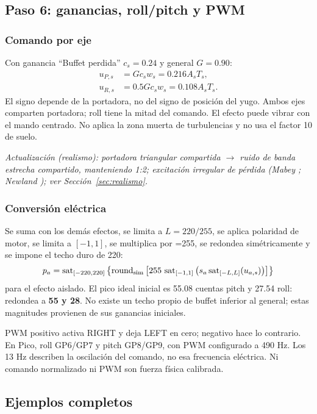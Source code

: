 \subsection{Paso 6: ganancias, roll/pitch y PWM}
\subsubsection{Comando por eje}
Con ganancia ``Buffet perdida'' $c_s=0.24$ y general $G=0.90$:
\begin{align}
u_{P,s}&=Gc_sw_s=0.216 A_sT_s,\\
u_{R,s}&=0.5Gc_sw_s=0.108 A_sT_s.
\end{align}
El signo depende de la portadora, no del signo de posición del yugo. Ambos ejes comparten portadora; roll tiene la mitad del comando. El efecto puede vibrar con el mando centrado. No aplica la zona muerta de turbulencias y no usa el factor 10 de suelo.

\textit{Actualización (realismo): portadora triangular compartida $\rightarrow$ ruido de banda estrecha compartido, manteniendo 1:2; excitación irregular de pérdida (Mabey \cite{mabey1988}; Newland \cite{newland1993}); ver Sección~\ref{sec:realismo}.}

\subsubsection{Conversión eléctrica}
Se suma con los demás efectos, se limita a $L=220/255$, se aplica polaridad de motor, se limita a $[-1,1]$, se multiplica por =255, se redondea simétricamente y se impone el techo duro de 220:
\begin{equation}
p_a=\operatorname{sat}_{[-220,220]}\left\{\operatorname{round}_{\rm sim}
\left[255\,\operatorname{sat}_{[-1,1]}\left(s_a\operatorname{sat}_{[-L,L]}(u_{a,s})\right)\right]\right\}
\end{equation}
para el efecto aislado. El pico ideal inicial es 55.08 cuentas pitch y 27.54 roll: redondea a \textbf{55 y 28}. No existe un techo propio de buffet inferior al general; estas magnitudes provienen de sus ganancias iniciales.

PWM positivo activa RIGHT y deja LEFT en cero; negativo hace lo contrario. En Pico, roll GP6/GP7 y pitch GP8/GP9, con PWM configurado a 490 Hz. Los 13 Hz describen la oscilación del comando, no esa frecuencia eléctrica. Ni comando normalizado ni PWM son fuerza física calibrada.

\subsection{Ejemplos completos}
